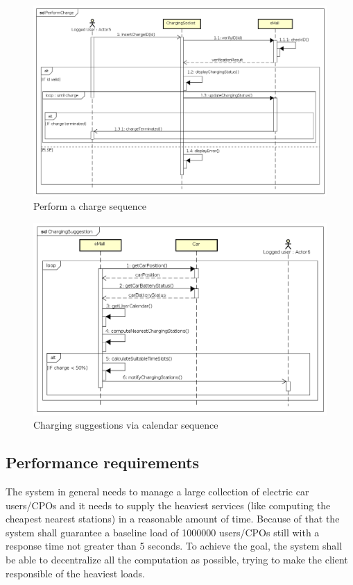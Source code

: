 \begin{figure}[!h]
    \begin{center}
        \includegraphics[keepaspectratio, width=16cm]{Sequence/PerformCharge.png}
        \caption{Perform a charge sequence}
    \end{center}
\end{figure}
\begin{figure}[!h]
    \begin{center}
        \includegraphics[keepaspectratio, width=16cm]{Sequence/ChargingSuggestion.png}
        \caption{Charging suggestions via calendar sequence}
    \end{center}
\end{figure}

\clearpage
\subsection{Performance requirements}
The system in general needs to manage a large collection of electric car users/\acp{CPO} and it needs to supply the heaviest services (like computing the cheapest nearest stations) in a reasonable amount of time.
Because of that the system shall guarantee a baseline load of 1000000 users/\acp{CPO} still with a response time not greater than 5 seconds. To achieve the goal, the system shall be able to decentralize all the computation as possible,
trying to make the client responsible of the heaviest loads.
